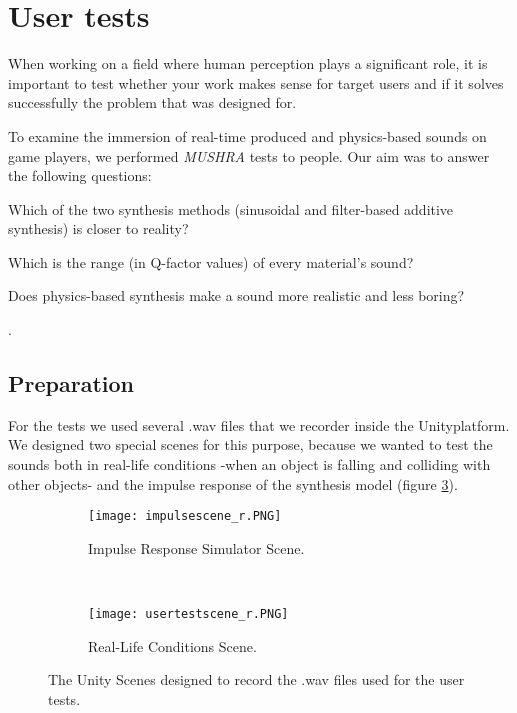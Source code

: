 \section{User tests}\label{sec:tests}

When working on a field where human perception plays a significant role, it is important to test whether your work makes sense for target users and if it solves successfully the problem that was designed for.

To examine the immersion of real-time produced and physics-based sounds on game players, we performed \textit{MUSHRA}\cite{series2014method} tests to people. Our aim was to answer the following questions: \begin{inparaenum}[1)]
\item Which of the two synthesis methods (sinusoidal and filter-based additive synthesis) is closer to reality? 
\item Which is the range (in Q-factor values) of every material's sound?
\item Does physics-based synthesis make a sound more realistic and less boring?
\end{inparaenum}.

\subsection{Preparation}
For the tests we used several .wav files that we recorder inside the Unity\textregistered platform. We designed two special scenes for this purpose, because we wanted to test the sounds both in real-life conditions -when an object is falling and colliding with other objects- and the impulse response of the synthesis model (figure \ref{fig:test_scenes}). 

\begin{figure}[H]
    \centering
    \begin{subfigure}[b]{0.45\textwidth}
        \texttt{[image: impulsescene\_r.PNG]}
        \caption{Impulse Response Simulator Scene.}
        \label{fig:test_sc1}
    \end{subfigure}
    ~ %
    \begin{subfigure}[b]{0.45\textwidth}
        \texttt{[image: usertestscene\_r.PNG]}
        \caption{Real-Life Conditions Scene.}
        \label{fig:test_sc2}
    \end{subfigure}
    \caption{The Unity Scenes designed to record the .wav files used for the user tests.}\label{fig:test_scenes}
\end{figure}

